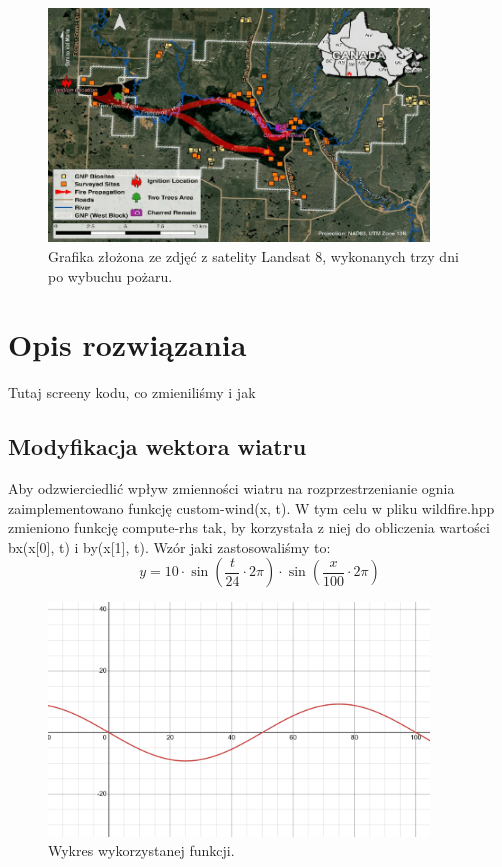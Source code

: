 \documentclass[onecolumn,12pt]{article}
\begin{document}
\begin{figure}[H]
    \centering
    \includegraphics[width=0.9\textwidth]{fire-map-1.png}
    \caption{Grafika złożona ze zdjęć z satelity Landsat 8, wykonanych trzy dni po wybuchu pożaru.}
    \label{fig:example}
\end{figure}
        
\section{Opis rozwiązania}
Tutaj screeny kodu, co zmieniliśmy i jak

\subsection{Modyfikacja wektora wiatru}
Aby odzwierciedlić wpływ zmienności wiatru na rozprzestrzenianie ognia zaimplementowano funkcję custom-wind(x, t). W tym celu w pliku wildfire.hpp  zmieniono funkcję compute-rhs tak, by korzystała z niej do obliczenia wartości bx(x[0], t) i by(x[1], t). Wzór jaki zastosowaliśmy to:
\[
y = 10 \cdot\sin\left(\frac{t}{24} \cdot 2\pi\right) \cdot \sin\left(\frac{x}{100} \cdot 2\pi\right)
\]

\begin{figure}[h]
    \centering
    \includegraphics[width=0.9\textwidth]{wind graph.png}
    \caption{Wykres wykorzystanej funkcji.}
    \label{fig:example}
\end{figure}
\end{document}

